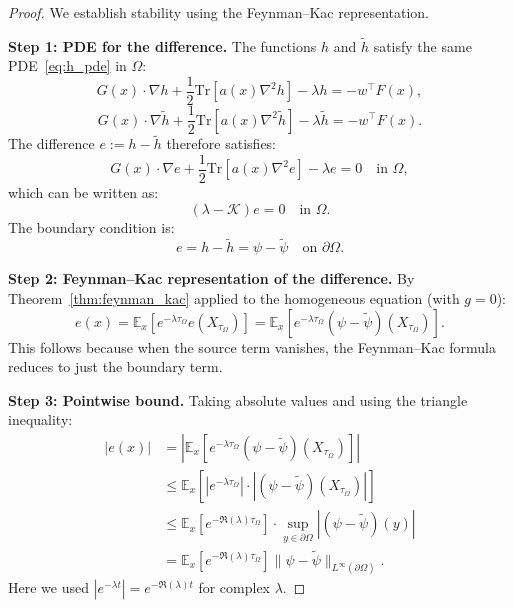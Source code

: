 \documentclass[11pt,a4paper]{article}
\newcommand{\E}{\mathbb{E}}
\newcommand{\Tr}{\mathrm{Tr}}
\newcommand{\Koop}{\mathcal{K}}
\begin{document}
\begin{proof}
We establish stability using the Feynman--Kac representation.

\textbf{Step 1: PDE for the difference.}
The functions $h$ and $\tilde{h}$ satisfy the same PDE~\eqref{eq:h_pde} in $\Omega$:
\begin{equation}
G(x) \cdot \nabla h + \frac{1}{2}\Tr[a(x)\nabla^2 h] - \lambda h = -w^\top F(x),
\end{equation}
\begin{equation}
G(x) \cdot \nabla \tilde{h} + \frac{1}{2}\Tr[a(x)\nabla^2 \tilde{h}] - \lambda \tilde{h} = -w^\top F(x).
\end{equation}
The difference $e := h - \tilde{h}$ therefore satisfies:
\begin{equation}
G(x) \cdot \nabla e + \frac{1}{2}\Tr[a(x)\nabla^2 e] - \lambda e = 0 \quad \text{in } \Omega,
\end{equation}
which can be written as:
\begin{equation}
(\lambda - \Koop) e = 0 \quad \text{in } \Omega.
\end{equation}
The boundary condition is:
\begin{equation}
e = h - \tilde{h} = \psi - \tilde{\psi} \quad \text{on } \partial\Omega.
\end{equation}

\textbf{Step 2: Feynman--Kac representation of the difference.}
By Theorem~\ref{thm:feynman_kac} applied to the homogeneous equation (with $g = 0$):
\begin{equation}
e(x) = \E_x\left[e^{-\lambda \tau_\Omega} e(X_{\tau_\Omega})\right] = \E_x\left[e^{-\lambda \tau_\Omega} (\psi - \tilde{\psi})(X_{\tau_\Omega})\right].
\end{equation}
This follows because when the source term vanishes, the Feynman--Kac formula reduces to just the boundary term.

\textbf{Step 3: Pointwise bound.}
Taking absolute values and using the triangle inequality:
\begin{align}
|e(x)| &= \left|\E_x\left[e^{-\lambda \tau_\Omega} (\psi - \tilde{\psi})(X_{\tau_\Omega})\right]\right| \\
&\leq \E_x\left[\left|e^{-\lambda \tau_\Omega}\right| \cdot |(\psi - \tilde{\psi})(X_{\tau_\Omega})|\right] \\
&\leq \E_x\left[e^{-\Re(\lambda) \tau_\Omega}\right] \cdot \sup_{y \in \partial\Omega}|(\psi - \tilde{\psi})(y)| \\
&= \E_x\left[e^{-\Re(\lambda) \tau_\Omega}\right] \|\psi - \tilde{\psi}\|_{L^\infty(\partial\Omega)}.
\end{align}
Here we used $|e^{-\lambda t}| = e^{-\Re(\lambda) t}$ for complex $\lambda$.


\end{proof}
\end{document}
